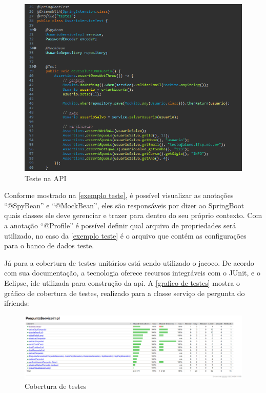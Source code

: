 \begin{figure}[htb]
\centering
\caption{\label{exemplo teste} Teste na API}
\includegraphics[width=1\textwidth]{anexos/Imagens_Testes/API_teste.png}
\end{figure}
\FloatBarrier

Conforme mostrado na \autoref{exemplo teste}, é possível visualizar as anotações ``@SpyBean'' e ``@MockBean'', eles são responsáveis por dizer ao \gls{SpringBoot} quais classes ele deve gerenciar e trazer para dentro do seu próprio contexto. Com a anotação ``@Profile'' é possível definir qual arquivo de propriedades será utilizado, no caso da \autoref{exemplo teste} é o arquivo que contém as configurações para o banco de dados teste.

Já para a cobertura de testes unitários está sendo utilizado o \acs{jacoco}. De acordo com sua documentação, a tecnologia oferece recursos integráveis com o \gls{JUnit}, e o \gls{Eclipse}, \acs{ide} utilizada para construção da \acs{api}. A \autoref{grafico de testes} mostra o gráfico de cobertura de testes, realizado para a classe serviço de pergunta do \gls{ifriends}:

\begin{figure}[htb]
\centering
\caption{\label{grafico de testes} Cobertura de testes}
\includegraphics[width=1\textwidth]{anexos/Imagens_Testes/API_grafico-testes.png}
\end{figure}
\FloatBarrier

